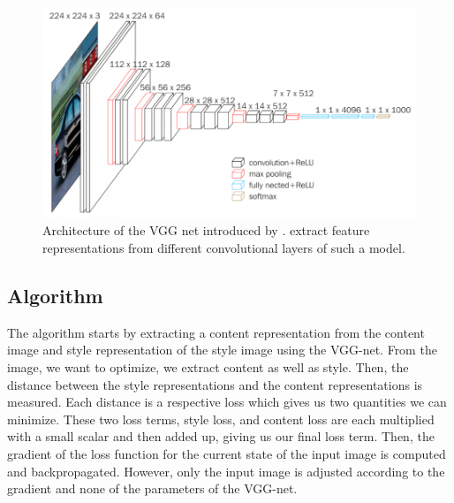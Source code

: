 \documentclass{seminar}
\begin{document}
	\begin{figure} %
		\centering
		\includegraphics[scale=0.37]{vgg16.png}
		\caption{Architecture of the VGG net introduced by \cite{simonyan2014very}. \cite{gatys2015neural} extract feature representations from different convolutional layers of such a model.}
		\label{fig:vgg}
	\end{figure}
	
	\subsection{Algorithm}
	The algorithm starts by extracting a content representation from the content image and style representation of the style image using the VGG-net. From the image, we want to optimize, we extract content as well as style. Then, the distance between the style representations and the content representations is measured. Each distance is a respective loss which gives us two quantities we can minimize. These two loss terms, style loss, and content loss are each multiplied with a small scalar and then added up, giving us our final loss term. Then, the gradient of the loss function for the current state of the input image is computed and backpropagated. However, only the input image is adjusted according to the gradient and none of the parameters of the VGG-net.
	
	
\end{document}

